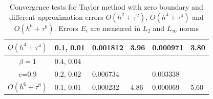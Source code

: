 \documentclass{beamer}
\begin{document}
\begin{frame}
\begin{table}[ht]
{\begin{tabular}{||c|l|ll|ll||}
       $O(h^4+ \tau^4)$ &0.1, 0.01   &0.001812 & 3.96  & 0.000971  & 3.80  \\
    \hline
  $\beta=1$     &0.4, 0.04   &            &          &                  &      \\
      c=0.9                    &0.2, 0.02   &0.006734 &           & 0.003338      &       \\
     $O(h^6+ \tau^6)$ &0.1, 0.01 & 0.000232 &4.86 & 0.000069  & 5.60        \\
	   \hline
			\hline 
		\end{tabular}
		}%
		\caption{Convergence tests for Taylor method with zero boundary and different approximation errors $O(h^{2} + \tau^2 )$, $O(h^{4} + \tau^4 )$ and $O(h^{6} + \tau^6 )$. Errors $E_i$ are measured in $L_2$ and $L_\infty$ norms}
\label{table:A}
\end{table}

\end{frame}

\end{document}
